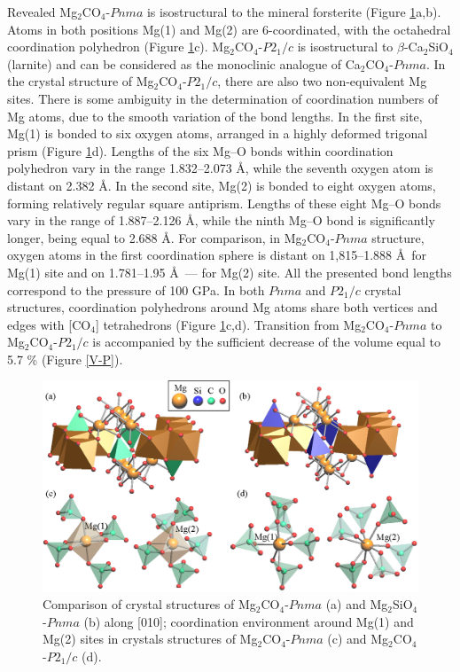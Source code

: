 \documentclass[a4paperm]{article}
\begin{document}
Revealed Mg$_2$CO$_4$-$Pnma$ is isostructural to the mineral forsterite (Figure \ref{str}a,b).
Atoms in both positions Mg(1) and Mg(2) are 6-coordinated, with the octahedral coordination polyhedron (Figure \ref{str}c). 
Mg$_2$CO$_4$-$P2_1/c$ is isostructural to $\beta$-Ca$_2$SiO$_4$ (larnite) and can be considered as the monoclinic analogue of Ca$_2$CO$_4$-$Pnma$.
In the crystal structure of Mg$_2$CO$_4$-$P2_1/c$, there are also two non-equivalent Mg sites.
There is some ambiguity in the determination of coordination numbers of Mg atoms, due to the smooth variation of the bond lengths.
In the first site, Mg(1) is bonded to six oxygen atoms, arranged in a highly deformed trigonal prism  (Figure \ref{str}d).
Lengths of the six Mg--O bonds within coordination polyhedron vary in the range 1.832--2.073 \AA, while the seventh oxygen atom is distant on 2.382 \AA.
In the second site, Mg(2) is bonded to eight oxygen atoms, forming relatively regular square antiprism.
Lengths of these eight Mg--O bonds vary in the range of 1.887--2.126 \AA, while the ninth Mg--O bond is significantly longer, being equal to 2.688 \AA.
For comparison, in Mg$_2$CO$_4$-$Pnma$ structure, oxygen atoms in the first coordination sphere is distant on 1,815--1.888 \AA\ for Mg(1) site and on 1.781--1.95 \AA\ --- for Mg(2) site.
All the presented bond lengths correspond to the pressure of 100 GPa.
{\color{blue}
In both $Pnma$ and $P2_1/c$ crystal structures, coordination polyhedrons around Mg atoms share both vertices and edges with [CO$_4$] tetrahedrons (Figure \ref{str}c,d).
}
Transition from Mg$_2$CO$_4$-$Pnma$ to Mg$_2$CO$_4$-$P2_1/c$ is accompanied by the sufficient decrease of the volume equal to 5.7 \% (Figure \ref{V-P}).

\begin{figure}[H]
	\includegraphics[width=\textwidth]{mg2co4_str} \centering
	\caption{
		{\color{blue}
		Comparison of crystal structures of Mg$_2$CO$_4$-$Pnma$ (a) and Mg$_2$SiO$_4$-$Pnma$ (b) along [010]; coordination environment around Mg(1) and Mg(2) sites in crystals structures of Mg$_2$CO$_4$-$Pnma$ (c) and Mg$_2$CO$_4$-$P2_1/c$ (d).
	}	
} 	\label{str}
\end{figure}
\end{document}
